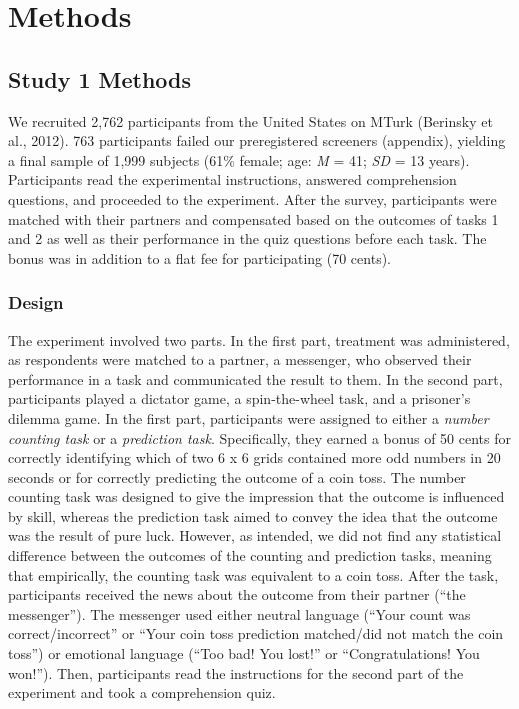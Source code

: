 \section{Methods}

\subsection{Study 1 Methods}

We recruited 2,762 participants from the United States on MTurk
(Berinsky et al., 2012). 763 participants failed our preregistered
screeners (appendix), yielding a final sample of 1,999 subjects (61\%
female; age: \emph{M} = 41; \emph{SD} = 13 years). Participants read the
experimental instructions, answered comprehension questions, and
proceeded to the experiment. After the survey, participants were matched
with their partners and compensated based on the outcomes of tasks 1 and
2 as well as their performance in the quiz questions before each task.
The bonus was in addition to a flat fee for participating (70 cents).

\subsubsection{Design}

The experiment involved two parts. In the first part, treatment was
administered, as respondents were matched to a partner, a messenger, who
observed their performance in a task and communicated the result to
them. In the second part, participants played a dictator game, a
spin-the-wheel task, and a prisoner's dilemma game. In the first part,
participants were assigned to either a \emph{number counting task} or a
\emph{prediction task}. Specifically, they earned a bonus of 50 cents
for correctly identifying which of two 6 x 6 grids contained more odd
numbers in 20 seconds or for correctly predicting the outcome of a coin
toss. The number counting task was designed to give the impression that
the outcome is influenced by skill, whereas the prediction task aimed to
convey the idea that the outcome was the result of pure luck. However,
as intended, we did not find any statistical difference between the
outcomes of the counting and prediction tasks, meaning that empirically,
the counting task was equivalent to a coin toss. After the task,
participants received the news about the outcome from their partner
(``the messenger''). The messenger used either neutral language (``Your
count was correct/incorrect'' or ``Your coin toss prediction matched/did
not match the coin toss'') or emotional language (``Too bad! You lost!''
or ``Congratulations! You won!''). Then, participants read the
instructions for the second part of the experiment and took a
comprehension quiz.

